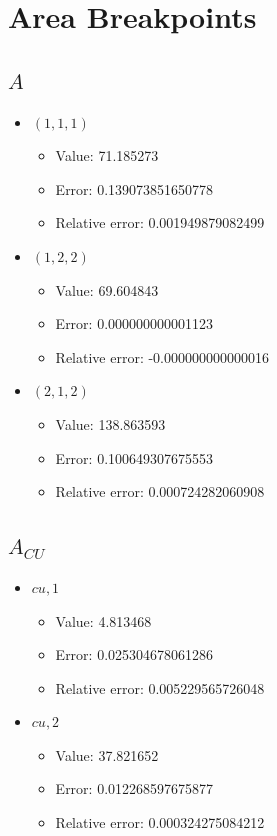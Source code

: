 \documentclass{article}%
\begin{document}
\section{Area Breakpoints}%
\thispagestyle{plain}%
\subsection{$A$}%
\begin{itemize}%
	\item $(1, 1, 1)$%
	\begin{itemize}%
		\item Value: 71.185273%
		\item Error: 0.139073851650778%
		\item Relative error: 0.001949879082499%
	\end{itemize}%
	\item $(1, 2, 2)$%
	\begin{itemize}%
		\item Value: 69.604843%
		\item Error: 0.000000000001123%
		\item Relative error: -0.000000000000016%
	\end{itemize}%
	\item $(2, 1, 2)$%
	\begin{itemize}%
		\item Value: 138.863593%
		\item Error: 0.100649307675553%
		\item Relative error: 0.000724282060908%
	\end{itemize}%
\end{itemize}%
\subsection{$A_{CU}$}%
\begin{itemize}%
	\item $\textit{cu},1$%
	\begin{itemize}%
		\item Value: 4.813468%
		\item Error: 0.025304678061286%
		\item Relative error: 0.005229565726048%
	\end{itemize}%
	\item $\textit{cu},2$%
	\begin{itemize}%
		\item Value: 37.821652%
		\item Error: 0.012268597675877%
		\item Relative error: 0.000324275084212%
	\end{itemize}%
\end{itemize}%
\end{document}
